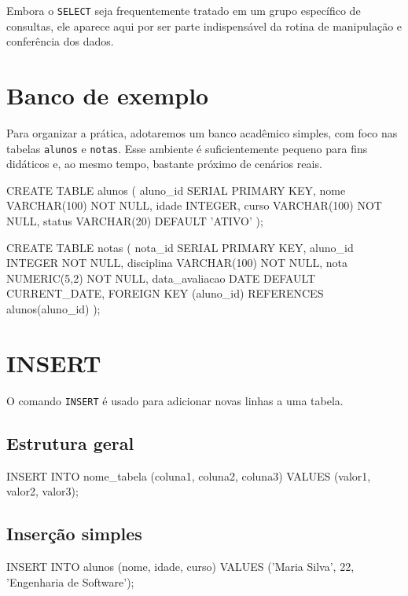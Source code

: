 Embora o \texttt{SELECT} seja frequentemente tratado em um grupo específico de consultas, ele aparece aqui por ser parte indispensável da rotina de manipulação e conferência dos dados.

\section{Banco de exemplo}

Para organizar a prática, adotaremos um banco acadêmico simples, com foco nas tabelas \texttt{alunos} e \texttt{notas}. Esse ambiente é suficientemente pequeno para fins didáticos e, ao mesmo tempo, bastante próximo de cenários reais.

\begin{sqlcode}
CREATE TABLE alunos (
    aluno_id SERIAL PRIMARY KEY,
    nome VARCHAR(100) NOT NULL,
    idade INTEGER,
    curso VARCHAR(100) NOT NULL,
    status VARCHAR(20) DEFAULT 'ATIVO'
);
\end{sqlcode}

\begin{sqlcode}
CREATE TABLE notas (
    nota_id SERIAL PRIMARY KEY,
    aluno_id INTEGER NOT NULL,
    disciplina VARCHAR(100) NOT NULL,
    nota NUMERIC(5,2) NOT NULL,
    data_avaliacao DATE DEFAULT CURRENT_DATE,
    FOREIGN KEY (aluno_id) REFERENCES alunos(aluno_id)
);
\end{sqlcode}

\section{INSERT}
 
O comando \texttt{INSERT} é usado para adicionar novas linhas a uma tabela.

\subsection{Estrutura geral}

\begin{sqlcode}
INSERT INTO nome_tabela (coluna1, coluna2, coluna3)
VALUES (valor1, valor2, valor3);
\end{sqlcode}

\subsection{Inserção simples}

\begin{sqlcode}
INSERT INTO alunos (nome, idade, curso)
VALUES ('Maria Silva', 22, 'Engenharia de Software');
\end{sqlcode}

